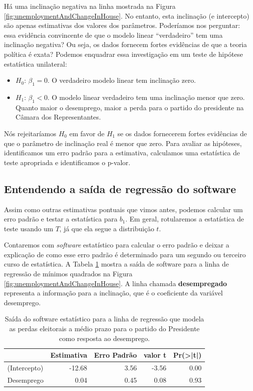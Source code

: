 \documentclass[
]{book}
\theoremstyle{definition}
\theoremstyle{definition}
\theoremstyle{definition}
\theoremstyle{definition}
\theoremstyle{remark}
\begin{document}
Há uma inclinação negativa na linha mostrada na Figura \ref{fig:unemploymentAndChangeInHouse}. No entanto, esta inclinação (e intercepto) são apenas estimativas dos valores dos parâmetros. Poderíamos nos perguntar: essa evidência convincente de que o modelo linear ``verdadeiro'' tem uma inclinação negativa? Ou seja, os dados fornecem fortes evidências de que a teoria política é exata? Podemos enquadrar essa investigação em um teste de hipótese estatística unilateral:

\begin{itemize}
\item
  \(H_0\): \(\beta_1 = 0\). O verdadeiro modelo linear tem inclinação zero.
\item
  \(H_1\): \(\beta_1 < 0\). O modelo linear verdadeiro tem uma inclinação menor que zero. Quanto maior o desemprego, maior a perda para o partido do presidente na Câmara dos Representantes.
\end{itemize}

Nós rejeitaríamos \(H_0\) em favor de \(H_1\) se os dados fornecerem fortes evidências de que o parâmetro de inclinação real é menor que zero. Para avaliar as hipóteses, identificamos um erro padrão para a estimativa, calculamos uma estatística de teste apropriada e identificamos o p-valor.

\hypertarget{testStatisticForTheSlope}{%
\subsection{Entendendo a saída de regressão do software}\label{testStatisticForTheSlope}}

Assim como outras estimativas pontuais que vimos antes, podemos calcular um erro padrão e testar a estatística para \(b_1\). Em geral, rotularemos a estatística de teste usando um \(T\), já que ela segue a distribuição \(t\).

Contaremos com \emph{software} estatístico para calcular o erro padrão e deixar a explicação de como esse erro padrão é determinado para um segundo ou terceiro curso de estatística. A Tabela \ref{tab:midtermElectionUnemploymentRRegressionOutput} mostra a saída de software para a linha de regressão de mínimos quadrados na Figura \ref{fig:unemploymentAndChangeInHouse}. A linha chamada \textbf{desempregado} representa a informação para a inclinação, que é o coeficiente da variável desemprego.

\begin{table}

\caption{\label{tab:midtermElectionUnemploymentRRegressionOutput}Saída do software estatístico para a linha de regressão que modela as perdas eleitorais a médio prazo para o partido do Presidente como resposta ao desemprego.}
\centering
\begin{tabular}[t]{l|r|r|r|r}
\hline
  & Estimativa & Erro Padrão & valor t & Pr(>|t|)\\
\hline
(Intercepto) & -12.68 & 3.56 & -3.56 & 0.00\\
\hline
Desemprego & 0.04 & 0.45 & 0.08 & 0.93\\
\hline
\end{tabular}
\end{table}
\end{document}
